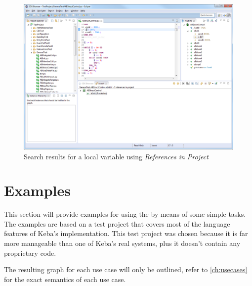 \begin{figure}[p]
  \centering
    \includegraphics[width=\textwidth]{bilder/manual-search}
  \caption{Search results for a local variable using \emph{References in Project}}
  \label{fig:manual-search}
\end{figure}



\section{Examples} \label{sec:manual-examples}



This section will provide examples for using the \SB by means of some simple tasks. The examples are based on a test 
project that covers most of the language features of Keba's \IEC implementation. This test project was chosen because 
it is far more manageable than one of Keba's real systems, plus it doesn't contain any proprietary code.

The resulting graph for each use case will only be outlined, refer to \autoref{ch:usecases} for the exact semantics of 
each use case.

